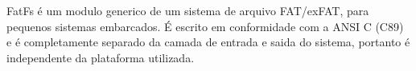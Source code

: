 FatFs é um modulo generico de um sistema de arquivo FAT/exFAT, para pequenos sistemas embarcados. É escrito em conformidade com a ANSI C (C89) e é completamente separado da camada de entrada e saida do sistema, portanto é independente da plataforma utilizada.





